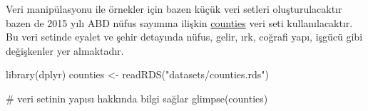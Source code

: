 \documentclass[
  letterpaper,
  DIV=11,
  numbers=noendperiod]{scrreprt}
\newenvironment{Shaded}{\begin{snugshade}}{\end{snugshade}}
\newcommand{\CommentTok}[1]{\textcolor[rgb]{0.37,0.37,0.37}{#1}}
\newcommand{\FunctionTok}[1]{\textcolor[rgb]{0.28,0.35,0.67}{#1}}
\newcommand{\NormalTok}[1]{\textcolor[rgb]{0.00,0.23,0.31}{#1}}
\newcommand{\OtherTok}[1]{\textcolor[rgb]{0.00,0.23,0.31}{#1}}
\newcommand{\StringTok}[1]{\textcolor[rgb]{0.13,0.47,0.30}{#1}}
\begin{document}
Veri manipülasyonu ile örnekler için bazen küçük veri setleri
oluşturulacaktır bazen de 2015 yılı ABD nüfus sayımına ilişkin
\href{https://github.com/MFatihTuzen/r-book-tr/blob/main/datasets/counties.rds}{counties}
veri seti kullanılacaktır. Bu veri setinde eyalet ve şehir detayında
nüfus, gelir, ırk, coğrafi yapı, işgücü gibi değişkenler yer almaktadır.

\begin{Shaded}
\begin{Highlighting}[]
\FunctionTok{library}\NormalTok{(dplyr)}
\NormalTok{counties }\OtherTok{\textless{}{-}} \FunctionTok{readRDS}\NormalTok{(}\StringTok{"datasets/counties.rds"}\NormalTok{)}

\CommentTok{\# veri setinin yapısı hakkında bilgi sağlar}
\FunctionTok{glimpse}\NormalTok{(counties)}
\end{Highlighting}
\end{Shaded}
\end{document}
